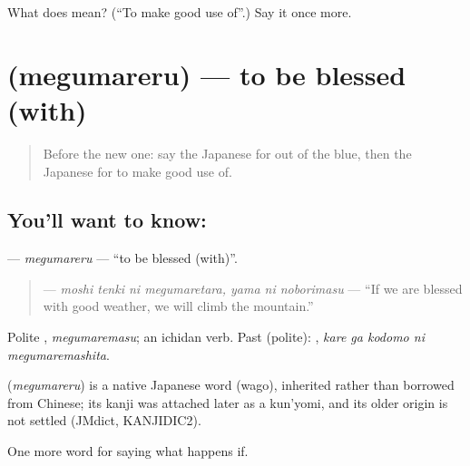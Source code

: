 \begin{tcolorbox}[breakable,colback=teal!4,colframe=teal!35!black,title={Before you move on}]
What does  mean? (\textquotedblleft{}To make good use of\textquotedblright{}.) Say it once more.
\end{tcolorbox}
\section[\texorpdfstring{\ja{めぐまれる} (megumareru)}{めぐまれる (megumareru)}]{ (megumareru) — to be blessed (with)}

\label{lesson:JA-C510-megumareru}



\begin{quote}
Before the new one: say the Japanese for out of the blue, then the Japanese for to make good use of.
\end{quote}

\subsection*{You'll want to know: }
\textbf{} — \emph{megumareru} — \textquotedblleft{}to be blessed (with)\textquotedblright{}.

\begin{quote}
\textbf{   } — \emph{moshi tenki ni megumaretara, yama ni noborimasu} — \textquotedblleft{}If we are blessed with good weather, we will climb the mountain.\textquotedblright{}
\end{quote}

Polite \textbf{}, \emph{megumaremasu}; an ichidan verb. Past (polite): \textbf{  }, \emph{kare ga kodomo ni megumaremashita}.

\begin{cousinweb}
\textbf{} (\emph{megumareru}) is a native Japanese word (wago), inherited rather than borrowed from Chinese; its kanji was attached later as a kun'yomi, and its older origin is not settled (JMdict, KANJIDIC2).
\end{cousinweb}

\begin{grammarlens}[title={What you've built}]
One more word for saying what happens if.
\end{grammarlens}

